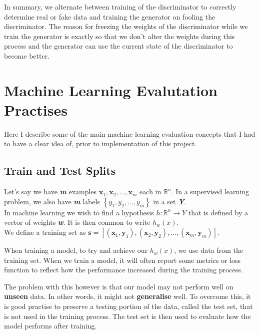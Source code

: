 \documentclass[12pt,a4paper,twoside]{report}
\begin{document}
In summary, we alternate between training of the discriminator to correctly determine real or fake data and training the generator on fooling the discriminator. The reason for freezing the weights of the discriminator while we train the generator is exactly so that we don't alter the weights during this process and the generator can use the current state of the discriminator to become better.

\section{Machine Learning Evalutation Practises}
Here I describe some of the main machine learning evaluation concepts that I had to have a clear idea of, prior to implementation of this project. 

\subsection{Train and Test Splits}
Let's say we have \textbf{\textit{m}} examples $ \mathbf { x } _ { 1} ,\mathbf { x } _ { 2} ,\dots ,\mathbf { x } _ { m }$ each in $\mathbb { R } ^ { n }$. In a supervised learning problem, we also have \textbf{\textit{m}} labels $\left\{ y _ { 1} ,y _ { 2} ,\dots ,y _ { m } \right\}$ in a set \textbf{\textit{Y}}.\\
In machine learning we wish to find a hypothesis $h : \mathbb { R } ^ { n } \rightarrow Y$ that is defined by a vector of weights \textbf{\textit{w}}. It is then common to write $h _ { w } ( x )$.\\

We define a training set as $\mathbf{s} = [(\mathbf { x } _ { 1}, \mathbf { y } _ { 1}),(\mathbf { x } _ { 2}, \mathbf { y } _ { 2}),\dots,(\mathbf { x } _ { m}, \mathbf { y } _ { m})]$.
 
When training a model, to try and achieve our $h _ { w } ( x )$, we use data from the training set. When we train a model, it will often report some metrics or loss function to reflect how the performance increased during the training process. 

The problem with this however is that our model may not perform well on \textbf{unseen} data. In other words, it might not \textbf{generalise} well. To overcome this, it is good practise to preserve a testing portion of the data, called the test set, that is not used in the training process. The test set is then used to evaluate how the model performs after training. 
\end{document}
